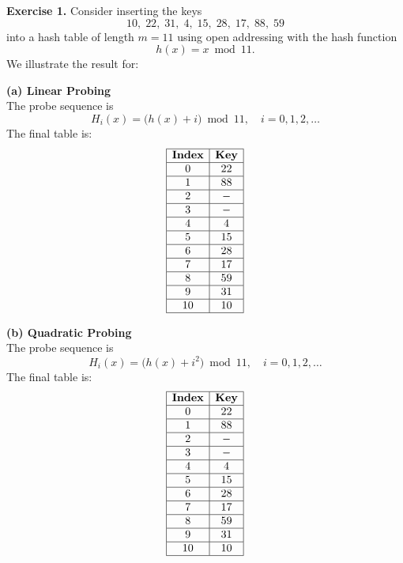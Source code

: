 \documentclass[11pt]{article}
\begin{document}
\textbf{Exercise 1.} Consider inserting the keys 
\[
10,\; 22,\; 31,\; 4,\; 15,\; 28,\; 17,\; 88,\; 59
\]
into a hash table of length \(m = 11\) using open addressing with the hash function 
\[
h(x)=x \bmod 11.
\]
We illustrate the result for:

\bigskip

\textbf{(a) Linear Probing}\\[2mm]
The probe sequence is 
\[
H_i(x)=\bigl(h(x)+i\bigr) \bmod 11,\quad i=0,1,2,\dots
\]
The final table is:
\[
\begin{array}{|c|c|}
\hline
\textbf{Index} & \textbf{Key} \\ \hline
0  & 22 \\ \hline
1  & 88 \\ \hline
2  & \;-\; \\ \hline
3  & \;-\; \\ \hline
4  & 4  \\ \hline
5  & 15 \\ \hline
6  & 28 \\ \hline
7  & 17 \\ \hline
8  & 59 \\ \hline
9  & 31 \\ \hline
10 & 10 \\ \hline
\end{array}
\]

\bigskip

\textbf{(b) Quadratic Probing}\\[2mm]
The probe sequence is 
\[
H_i(x)=\bigl(h(x)+i^2\bigr) \bmod 11,\quad i=0,1,2,\dots
\]
The final table is:
\[
\begin{array}{|c|c|}
\hline
\textbf{Index} & \textbf{Key} \\ \hline
0  & 22 \\ \hline
1  & 88 \\ \hline
2  & \;-\; \\ \hline
3  & \;-\; \\ \hline
4  & 4  \\ \hline
5  & 15 \\ \hline
6  & 28 \\ \hline
7  & 17 \\ \hline
8  & 59 \\ \hline
9  & 31 \\ \hline
10 & 10 \\ \hline
\end{array}
\]

\bigskip
\end{document}
